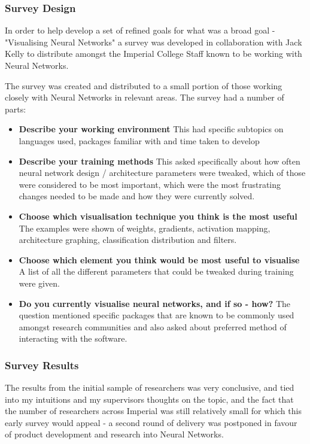 \documentclass[a4paper,11pt,titlepage]{article}
\begin{document}
	\subsubsection{Survey Design}
	\par
	In order to help develop a set of refined goals for what was a broad goal - "Visualising Neural Networks"	 a survey was developed in collaboration with Jack Kelly to distribute amongst the Imperial College Staff known to be working with Neural Networks.
	\par 
	The survey was created and distributed to a small portion of those working closely with Neural Networks in relevant areas. The survey had a number of parts:
	\begin{itemize}
	
		\item \textbf{Describe your working environment}
		This had specific subtopics on languages used, packages familiar with and time taken to develop
		\item \textbf{Describe your training methods}
		This asked specifically about how often neural network design / architecture parameters were tweaked, which of those were considered to be most important, which were the most frustrating changes needed to be made and how they were currently solved.
		\item \textbf{Choose which visualisation technique you think is the most useful}
		The examples were shown of weights, gradients, activation mapping, architecture graphing, classification distribution and filters. 
		\item \textbf{Choose which element you think would be most useful to visualise}
		A list of all the different parameters that could be tweaked during training were given.
		\item \textbf{Do you currently visualise neural networks, and if so - how?}
		The question mentioned specific packages that are known to be commonly used amongst research communities and also asked about preferred method of interacting with the software. 
	
	\end{itemize}
	
	\subsubsection{Survey Results}
	\par 
	The results from the initial sample of researchers was very conclusive, and tied into my intuitions and my supervisors thoughts on the topic, and the fact that the number of researchers across Imperial was still relatively small for which this early survey would appeal - a second round of delivery was postponed in favour of product development and research into Neural Networks.
	\par
\end{document}

